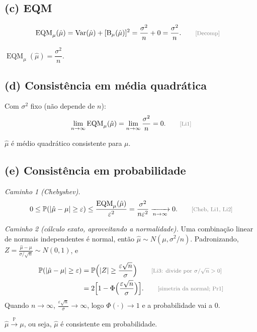 \documentclass[11pt,a4paper]{article}
\newcommand{\Var}{\operatorname{Var}}
\newcommand{\EQM}{\operatorname{EQM}}
\newcommand{\B}{\operatorname{B}}
\newcommand{\Prob}{\mathbb{P}}
\newcommand{\convP}{\xrightarrow{\;\Prob\;}}
\newcommand{\just}[1]{\tag*{\footnotesize\textcolor{gray}{[#1]}}}
\begin{document}
\subsection*{(c) EQM}
\begin{align*}
\EQM_\mu(\hat\mu)&=\Var(\hat\mu)+[\B_\mu(\hat\mu)]^2=\frac{\sigma^2}{n}+0=\frac{\sigma^2}{n}. \just{Decomp}
\end{align*}
\begin{resposta}
$\EQM_\mu(\hat\mu)=\dfrac{\sigma^2}{n}$.
\end{resposta}

\subsection*{(d) Consistência em média quadrática}
Com $\sigma^2$ fixo (não depende de $n$):
\[
\lim_{n\to\infty}\EQM_\mu(\hat\mu)=\lim_{n\to\infty}\frac{\sigma^2}{n}=0. \just{Li1}
\]
\begin{resposta}
$\hat\mu$ é médio quadrático consistente para $\mu$.
\end{resposta}

\subsection*{(e) Consistência em probabilidade}
\textit{Caminho 1 (Chebyshev).}
\[
0\le\Prob(|\hat\mu-\mu|\ge\varepsilon)\le\frac{\EQM_\mu(\hat\mu)}{\varepsilon^2}=\frac{\sigma^2}{n\varepsilon^2}\xrightarrow[n\to\infty]{}0 . \just{Cheb, Li1, Li2}
\]

\textit{Caminho 2 (cálculo exato, aproveitando a normalidade).} Uma combinação linear de normais independentes é normal, então $\hat\mu\sim N(\mu,\sigma^2/n)$. Padronizando, $Z=\frac{\hat\mu-\mu}{\sigma/\sqrt n}\sim N(0,1)$, e
\begin{align*}
\Prob(|\hat\mu-\mu|\ge\varepsilon)&=\Prob\Big(|Z|\ge\frac{\varepsilon\sqrt n}{\sigma}\Big) \just{Li3: divide por $\sigma/\sqrt n>0$}\\
&=2\Big[1-\Phi\Big(\frac{\varepsilon\sqrt n}{\sigma}\Big)\Big]. \just{simetria da normal; Pr1}
\end{align*}
Quando $n\to\infty$, $\frac{\varepsilon\sqrt n}{\sigma}\to\infty$, logo $\Phi(\cdot)\to1$ e a probabilidade vai a $0$.
\begin{resposta}
$\hat\mu\convP\mu$, ou seja, $\hat\mu$ é consistente em probabilidade.
\end{resposta}

\end{document}
